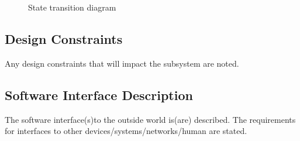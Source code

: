 \documentclass[oneside,a4paper,12pt]{report}
\begin{document}
\begin{center}
	\begin{figure}[!htbp]
		\centering
	  \caption{State transition diagram}
	  \label{fig:state-dig}
	\end{figure}
\end{center}

 \subsection{Design Constraints}
Any design constraints that will impact the subsystem are noted.
 \subsection{Software Interface Description}
The software interface(s)to the outside world is(are) described.
The requirements for interfaces to other devices/systems/networks/human are stated.
\end{document}
